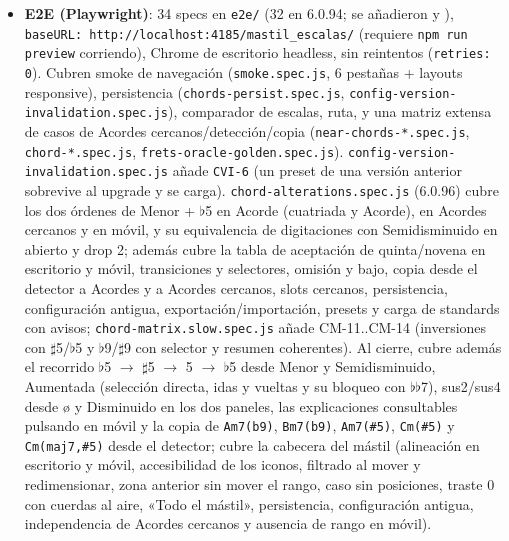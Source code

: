 \documentclass[a4paper,11pt,oneside]{report}
\newcommand{\flt}{\ensuremath{\flat}}
\newcommand{\shp}{\ensuremath{\sharp}}
\begin{document}
\begin{itemize}
\item \textbf{E2E (Playwright)}: 34 specs en \lstinline!e2e/! (32 en 6.0.94; se añadieron \texttt{} y \texttt{}), \lstinline!baseURL: http://localhost:4185/mastil_escalas/! (requiere \lstinline!npm run preview! corriendo), Chrome de escritorio headless, sin reintentos (\lstinline!retries: 0!). Cubren smoke de navegación (\lstinline!smoke.spec.js!, 6 pestañas + layouts responsive), persistencia (\lstinline!chords-persist.spec.js!, \lstinline!config-version-invalidation.spec.js!), comparador de escalas, ruta, y una matriz extensa de casos de Acordes cercanos/detección/copia (\lstinline!near-chords-*.spec.js!, \lstinline!chord-*.spec.js!, \lstinline!frets-oracle-golden.spec.js!). \lstinline!config-version-invalidation.spec.js! añade \lstinline!CVI-6! (un preset de una versión anterior sobrevive al upgrade y se carga). \lstinline!chord-alterations.spec.js! (6.0.96) cubre los dos órdenes de Menor + \flt5 en Acorde (cuatriada y Acorde), en Acordes cercanos y en móvil, y su equivalencia de digitaciones con Semidisminuido en abierto y drop 2; además cubre la tabla de aceptación de quinta/novena en escritorio y móvil, transiciones y selectores, omisión y bajo, copia desde el detector a Acordes y a Acordes cercanos, slots cercanos, persistencia, configuración antigua, exportación/importación, presets y carga de standards con avisos; \lstinline!chord-matrix.slow.spec.js! añade CM-11..CM-14 (inversiones con \shp5/\flt5 y \flt9/\shp9 con selector y resumen coherentes). Al cierre, \texttt{} cubre además el recorrido \flt5 $\to$ \shp5 $\to$ 5 $\to$ \flt5 desde Menor y Semidisminuido, Aumentada (selección directa, idas y vueltas y su bloqueo con \flt\flt7), sus2/sus4 desde ø y Disminuido en los dos paneles, las explicaciones consultables pulsando en móvil y la copia de \lstinline!Am7(b9)!, \lstinline!Bm7(b9)!, \lstinline!Am7(#5)!, \lstinline!Cm(#5)! y \lstinline!Cm(maj7,#5)! desde el detector; \texttt{} cubre la cabecera del mástil (alineación en escritorio y móvil, accesibilidad de los iconos, filtrado al mover y redimensionar, zona anterior sin mover el rango, caso sin posiciones, traste 0 con cuerdas al aire, «Todo el mástil», persistencia, configuración antigua, independencia de Acordes cercanos y ausencia de rango en móvil).

\end{itemize}
\end{document}
